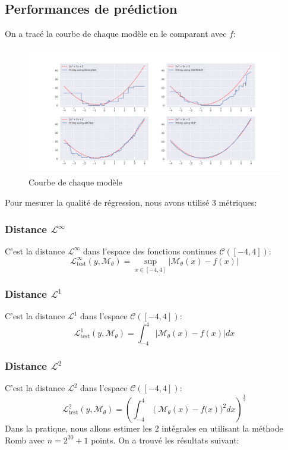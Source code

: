 \subsection{Performances de prédiction}
On a tracé la courbe de chaque modèle en le comparant avec $f$:
\begin{figure}[h!]
	\centering
	\includegraphics[width=1\textwidth]{Figures/RegressionPerformance.png}
	\caption{Courbe de chaque modèle}
	\label{fig:Regression-Curve}
\end{figure}
\FloatBarrier
Pour mesurer la qualité de régression, nous avons utilisé 3 métriques:
\subsubsection{Distance $\mathscr{L}^\infty$}
C'est la distance $\mathscr{L}^\infty$ dans l'espace des fonctions continues $\mathscr{C}([-4,4])$:
\begin{equation}
	\mathscr{L}^\infty_{\text{test}}(y,\mathcal{M}_\theta)=\sup_{x\in[-4,4]}\lvert \mathcal{M}_\theta(x)-f(x) \rvert
\end{equation}
\subsubsection{Distance $\mathscr{L}^1$}
C'est la distance $\mathscr{L}^1$ dans l'espace $\mathscr{C}([-4,4])$:
\begin{equation}
	\mathscr{L}^1_{\text{test}}(y,\mathcal{M}_\theta)=\int_{-4}^4 \lvert\mathcal{M}_\theta(x)-f(x)\rvert dx
\end{equation}
\subsubsection{Distance $\mathscr{L}^2$}
C'est la distance $\mathscr{L}^2$ dans l'espace $\mathscr{C}([-4,4])$:
\begin{equation}
	\mathscr{L}^2_{\text{test}}(y,\mathcal{M}_\theta)=\left(\int_{-4}^4 \left(\mathcal{M}_\theta(x)-f(x\right))^2 dx\right)^{\frac{1}{2}}
\end{equation}
Dans la pratique, nous allons estimer les 2 intégrales en utilisant la méthode Romb avec $n=2^{20}+1$ points.
\newline 
On a trouvé les résultats suivant:
\newline


